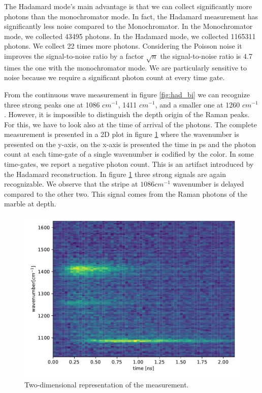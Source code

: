 \documentclass{osa-article}
\begin{document}
The Hadamard mode's main advantage is that we can collect significantly more photons than the monochromator mode. In fact, the Hadamard measurement has significantly less noise compared to the Monochromator. In the Monochromator mode, we collected 43495 photons. In the Hadamard mode, we collected 1165311 photons. We collect 22 times more photons. Considering the Poisson noise it improves the signal-to-noise ratio by a factor $\sqrt{n}$ the signal-to-noise ratio is 4.7 times the one with the monochromator mode. We are particularly sensitive to noise because we require a significant photon count at every time gate.

From the continuous wave measurement in figure \ref{fig:had_bi} we can recognize three strong peaks one at 1086 $cm^{-1}$, 1411 $cm^{-1}$, and a smaller one at 1260 $cm^{-1}$.
However, it is impossible to distinguish the depth origin of the Raman peaks. For this, we have to look also at the time of arrival of the photons.
The complete measurement is presented in a 2D plot in figure \ref{fig:2D} where the wavenumber is presented on the y-axis, on the x-axis is presented the time in ps and the photon count at each time-gate of a single wavenumber is codified by the color. 
In some time-gates, we report a negative photon count. This is an artifact introduced by the Hadamard reconstruction.
In figure \ref{fig:2D} three strong signals are again recognizable. We observe that the stripe at $1086 cm^{-1}$ wavenumber is delayed compared to the other two. This signal comes from the Raman photons of the marble at depth.  
\begin{figure}
    \centering
    \includegraphics[scale = 0.4]{figure/2D.pdf}
    \caption{Two-dimensional representation of the measurement.}
    \label{fig:2D}
\end{figure}
\end{document}
